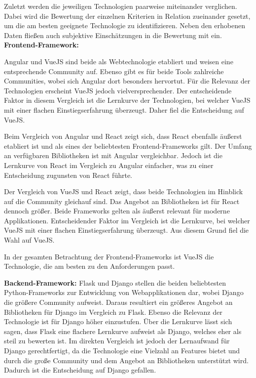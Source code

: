Zuletzt werden die jeweiligen Technologien paarweise miteinander verglichen.
Dabei wird die Bewertung der einzelnen Kriterien in Relation zueinander gesetzt, um die am besten geeignete Technologie zu identifizieren.
Neben den erhobenen Daten fließen auch subjektive Einschätzungen in die Bewertung mit ein.
\newpage
\textbf{Frontend-Framework:}

Angular und VueJS sind beide als Webtechnologie etabliert und weisen eine entsprechende Community auf.
Ebenso gibt es für beide Tools zahlreiche Communities, wobei sich Angular dort besonders hervortut.
Für die Relevanz der Technologien erscheint VueJS jedoch vielversprechender.
Der entscheidende Faktor in diesem Vergleich ist die Lernkurve der Technologien, bei welcher VueJS mit einer flachen Einstiegserfahrung überzeugt.
Daher fiel die Entscheidung auf VueJS.

Beim Vergleich von Angular und React zeigt sich, dass React ebenfalls äußerst etabliert ist und als eines der beliebtesten Frontend-Frameworks gilt.
Der Umfang an verfügbaren Bibliotheken ist mit Angular vergleichbar.
Jedoch ist die Lernkurve von React im Vergleich zu Angular einfacher, was zu einer Entscheidung zugunsten von React führte.

Der Vergleich von VueJS und React zeigt, dass beide Technologien im Hinblick auf die Community gleichauf sind.
Das Angebot an Bibliotheken ist für React dennoch größer.
Beide Frameworks gelten als äußerst relevant für moderne Applikationen.
Entscheidender Faktor im Vergleich ist die Lernkurve, bei welcher VueJS mit einer flachen Einstiegserfahrung überzeugt.
Aus diesem Grund fiel die Wahl auf VueJS.

In der gesamten Betrachtung der Frontend-Frameworks ist VueJS die Technologie, die am besten zu den Anforderungen passt.

\newpage
\textbf{Backend-Framework:}
Flask und Django stellen die beiden beliebtesten Python-Frameworks zur Entwicklung von Webapplikationen dar, wobei Django die größere Community aufweist.
Daraus resultiert ein größeres Angebot an Bibliotheken für Django im Vergleich zu Flask.
Ebenso die Relevanz der Technologie ist für Django höher einzustufen.
Über die Lernkurve lässt sich sagen, dass Flask eine flachere Lernkurve aufweist als Django, welches eher als steil zu bewerten ist.
Im direkten Vergleich ist jedoch der Lernaufwand für Django gerechtfertigt, da die Technologie eine Vielzahl an Features bietet und durch die große Community und dem Angebot an Bibliotheken unterstützt wird.
Dadurch ist die Entscheidung auf Django gefallen.

